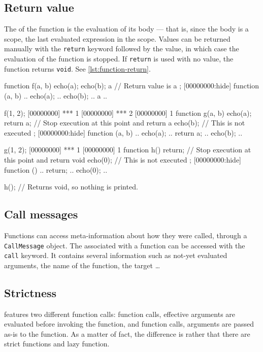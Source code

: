 \subsection{Return value}

The  of the function is the
evaluation of its body --- that is, since the body is a scope, the
last evaluated expression in the scope.  Values can be returned
manually with the \lstinline|return| keyword followed by the value, in
which case the evaluation of the function is stopped. If
\lstinline|return| is used with no value, the function returns
\lstinline|void|. See \autoref{lst:function-return}.

\begin{urbiscript}[caption=Returning values from functions,
  label=lst:function-return,float=\floatpos]
function f(a, b)
{
  echo(a);
  echo(b);
  a // Return value is a
};
[00000000:hide] function (a, b) {
..  echo(a);
..  echo(b);
..  a
..}

f(1, 2);
[00000000] *** 1
[00000000] *** 2
[00000000] 1
function g(a, b)
{
  echo(a);
  return a; // Stop execution at this point and return a
  echo(b); // This is not executed
};
[00000000:hide] function (a, b) {
..  echo(a);
..  return a;
..  echo(b);
..}

g(1, 2);
[00000000] *** 1
[00000000] 1
function h()
{
  return; // Stop execution at this point and return void
  echo(0); // This is not executed
};
[00000000:hide] function () {
..  return;
..  echo(0);
..}

h(); // Returns void, so nothing is printed.
\end{urbiscript}

\subsection{Call messages}
\label{sec:us-fun-callmsg}

Functions can access meta-information about how they were called,
through a \lstinline|CallMessage| object. The 
associated with a function can be accessed with the \lstinline|call|
keyword. It contains several information such as not-yet evaluated
arguments, the name of the function, the target \ldots

\subsection{Strictness}

\us features two different function calls:
 function calls, effective arguments are
evaluated before invoking the function, and 
function calls, arguments are passed as-is to the function.  As a
matter of fact, the difference is rather that there are strict
functions and lazy function.


